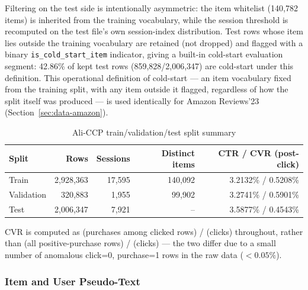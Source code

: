 Filtering on the test side is intentionally asymmetric: the item whitelist (140{,}782 items) is inherited from the training vocabulary, while the session threshold is recomputed on the test file's own session-index distribution. Test rows whose item lies outside the training vocabulary are retained (not dropped) and flagged with a binary \texttt{is\_cold\_start\_item} indicator, giving a built-in cold-start evaluation segment: 42.86\% of kept test rows (859{,}828/2{,}006{,}347) are cold-start under this definition. This operational definition of cold-start — an item vocabulary fixed from the training split, with any item outside it flagged, regardless of how the split itself was produced — is used identically for Amazon Reviews'23 (Section~\ref{sec:data-amazon}).

\begin{table}[h]
\centering
\caption{Ali-CCP train/validation/test split summary}
\label{tab:split-summary-aliccp}
\begin{tabular}{lrrrr}
\toprule
Split & Rows & Sessions & Distinct items & CTR / CVR (post-click) \\
\midrule
Train       & 2{,}928{,}363 & 17{,}595 & 140{,}092 & 3.2132\% / 0.5208\% \\
Validation  & 320{,}883     & 1{,}955  & 99{,}902  & 3.2741\% / 0.5901\% \\
Test        & 2{,}006{,}347 & 7{,}921  & --        & 3.5877\% / 0.4543\% \\
\bottomrule
\end{tabular}
\end{table}

CVR is computed as (purchases among clicked rows) / (clicks) throughout, rather than (all positive-purchase rows) / (clicks) --- the two differ due to a small number of anomalous click=0, purchase=1 rows in the raw data ($<0.05\%$).

\subsubsection{Item and User Pseudo-Text}

